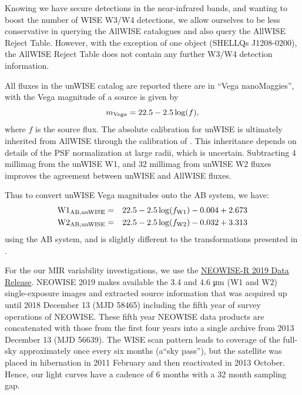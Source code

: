 \documentclass[usenatbib]{mnras}
\begin{document}
Knowing we have secure detections in the near-infrared bands, and wanting to boost the number of WISE W3/W4 detections, we allow ourselves to be less conservative in querying the AllWISE catalogues and also query the AllWISE Reject Table. However, with the exception of one object (SHELLQs  J1208-0200), the AllWISE Reject Table does not contain any further W3/W4 detection information. 

All fluxes in the unWISE catalog are reported there are in ``Vega
nanoMaggies'', with the Vega magnitude of a source is given by
\begin{equation}
m_{\rm Vega} = 22.5 - 2.5\log(f),
\end{equation} 
where $f$ is the source flux. The absolute calibration for unWISE is
ultimately inherited from AllWISE through the calibration of
\citet{Meisner2017a}. This inheritance depends on details of the PSF
normalization at large radii, which is uncertain. Subtracting 4
millimag from the unWISE W1, and 32 millimag from unWISE W2 fluxes
improves the agreement between unWISE and AllWISE fluxes.

Thus to convert unWISE Vega magnitudes onto the AB system, we have:     
\begin{eqnarray*}
        {\rm W1}_{\rm AB, unWISE}  & = &   22.5 - 2.5 \log(f_{\rm W1}) - 0.004 + 2.673  \\
       {\rm W2}_{\rm AB, unWISE}  &  = &  22.5 - 2.5 \log(f_{\rm W2}) - 0.032 +  3.313 \\
\end{eqnarray*}
using the \citet{TokunagaVacca2005} AB system, 
and is slightly different to the transformations presented in 
\citet{Schlafly2019}. 

For the our MIR variability investigations, we use the \href{http://wise2.ipac.caltech.edu/docs/release/neowise/}{NEOWISE-R 2019 Data Release}. NEOWISE 2019 makes available the 3.4 and 4.6 μm (W1 and W2) single-exposure images and extracted source information that was acquired up until 2018 December 13 (MJD 58465) including the fifth year of survey operations of NEOWISE. These fifth year NEOWISE data products are concatenated with those from the first four years into a single archive from 2013 December 13 (MJD 56639).
The WISE scan pattern leads to coverage of the full-sky approximately once every six months (a``sky pass''), but the satellite was placed in hibernation in 2011 February and then reactivated in 2013 October. Hence, our light curves have a cadence of 6 months with a 32 month sampling gap.
\end{document}

